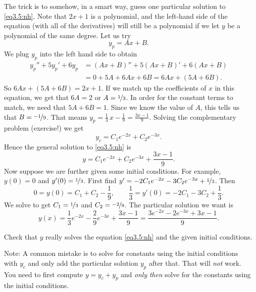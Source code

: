 The trick is to somehow, in a smart way, guess one particular solution to
\eqref{eq3.5:nh}.  Note that $2x+1$ is a polynomial, and the left-hand 
side of the equation (with all of the derivatives) will still be a polynomial if we let $y$ be a polynomial of
the same degree.  Let us try
\begin{equation*}
y_p = Ax + B .
\end{equation*}
We plug $y_p$ into the left hand side to obtain
\begin{equation*}
\begin{split}
y_p'' + 5y_p'+ 6y_p & =
(Ax+B)'' + 5(Ax+B)' + 6(Ax+B)
\\
& = 
0 + 5A + 6Ax + 6B = 6Ax+ (5A+6B) .
\end{split}
\end{equation*}
So $6Ax+(5A+6B) = 2x+1$. If we match up the coefficients of $x$ in this equation, we get that $6A = 2$ or $A = \nicefrac{1}{3}$. In order for the constant terms to match, we need that $5A + 6B = 1$. Since we know the value of $A$, this tells us that $B = \nicefrac{-1}{9}$.
That means
$y_p = \frac{1}{3}\, x - \frac{1}{9} = \frac{3x-1}{9}$.
Solving the complementary
problem (exercise!) we get
\begin{equation*}
y_c = C_1 e^{-2x} + C_2 e^{-3x}.
\end{equation*}
Hence the general solution to \eqref{eq3.5:nh} is
\begin{equation*}
y = C_1 e^{-2x} + C_2 e^{-3x} + \frac{3x-1}{9} .
\end{equation*}
Now suppose we are further given some initial conditions.  For example, $y(0) = 0$ and
$y'(0) = \nicefrac{1}{3}$.  First find $y' = - 2C_1 e^{-2x} - 3C_2 e^{-3x}
+ \nicefrac{1}{3}$.
Then
\begin{equation*}
0 = y(0) = C_1 + C_2 -\frac{1}{9} , \qquad
\frac{1}{3} = y'(0) = - 2C_1 - 3C_2 + \frac{1}{3} .
\end{equation*}
We solve to get $C_1 = \nicefrac{1}{3}$ and $C_2 = \nicefrac{-2}{9}$.
The particular solution we want is
\begin{equation*}
y(x) = \frac{1}{3} e^{-2x} - \frac{2}{9} e^{-3x} + \frac{3x-1}{9} =
\frac{3 e^{-2x} - 2 e^{-3x} + 3x-1}{9} .
\end{equation*}

\begin{exercise}
Check that $y$ really solves the equation \eqref{eq3.5:nh}
and the given initial conditions.
\end{exercise}

Note: A common mistake is to solve for constants using the initial
conditions with $y_c$ and only add the particular solution $y_p$ after that.
That will \emph{not} work.  You need to first compute $y = y_c + y_p$ and
\emph{only then} solve for the constants using the initial conditions.

